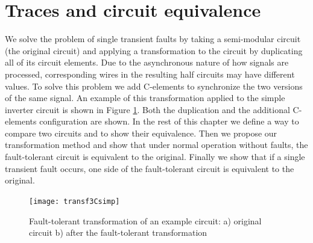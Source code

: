 \documentclass[12pt]{report}
\begin{document}
\section{Traces and circuit equivalence}
We solve the problem of single transient faults by taking a semi-modular circuit (the original circuit) and applying a transformation to the circuit by duplicating all of its circuit elements.  Due to the asynchronous nature of how signals are processed, corresponding wires in the resulting half circuits may have different values.  To solve this problem we add C-elements to synchronize the two versions of the same signal.   An example of this transformation applied to the simple inverter circuit is shown in Figure \ref{fig:dupschemeex}.  Both the duplication and the additional C-elements configuration are shown.  In the rest of this chapter we define a way to compare two circuits and to show their equivalence.  Then we propose our transformation method and show that under normal operation without faults, the fault-tolerant circuit is equivalent to the original.  Finally we show that if a single transient fault occurs, one side of the fault-tolerant circuit is equivalent to the original.\\
\begin{figure}
  \centering
    \texttt{[image: transf3Csimp]}
  \caption[Fault-tolerant transformation of an example circuit]{Fault-tolerant transformation of an example circuit: a) original circuit b) after the fault-tolerant transformation}
  \label{fig:dupschemeex}
\end{figure}
\end{document}
